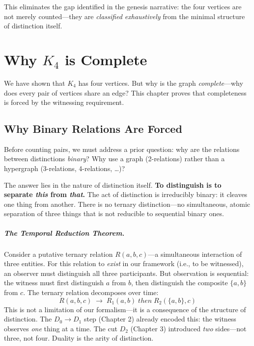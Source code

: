 \documentclass[11pt,a4paper]{book}
\def\text#1{#1}%
\begin{document}
This eliminates the gap identified in the genesis narrative: the four vertices are not
merely counted—they are \emph{classified exhaustively} from the minimal structure of
distinction itself.

\chapter[Why K4 is Complete]{Why $K_4$ is Complete}
\label{chap:why-complete}

We have shown that $K_4$ has four vertices. But why is the graph \emph{complete}—why 
does every pair of vertices share an edge? This chapter proves that completeness 
is forced by the witnessing requirement.

\section{Why Binary Relations Are Forced}
\label{sec:binary-forced}

Before counting pairs, we must address a prior question: why are the relations 
between distinctions \emph{binary}? Why use a graph (2-relations) rather than a 
hypergraph (3-relations, 4-relations, \ldots)?

The answer lies in the nature of distinction itself. \textbf{To distinguish is to 
separate \emph{this} from \emph{that}.} The act of distinction is irreducibly binary: 
it cleaves one thing from another. There is no ternary distinction---no simultaneous, 
atomic separation of three things that is not reducible to sequential binary ones.

\paragraph{The Temporal Reduction Theorem.}
Consider a putative ternary relation $R(a, b, c)$---a simultaneous interaction of 
three entities. For this relation to \emph{exist} in our framework (i.e., to be 
witnessed), an observer must distinguish all three participants. But observation is 
sequential: the witness must first distinguish $a$ from $b$, then distinguish the 
composite $\{a, b\}$ from $c$. The ternary relation decomposes over time:
\[
R(a, b, c) \;\longrightarrow\; R_1(a, b) \;\text{then}\; R_2(\{a,b\}, c)
\]
This is not a limitation of our formalism---it is a consequence of the structure 
of distinction. The $D_0 \to D_1$ step (Chapter 2) already encoded this: the witness 
observes \emph{one} thing at a time. The cut $D_2$ (Chapter 3) introduced \emph{two} 
sides---not three, not four. Duality is the arity of distinction.
\end{document}
